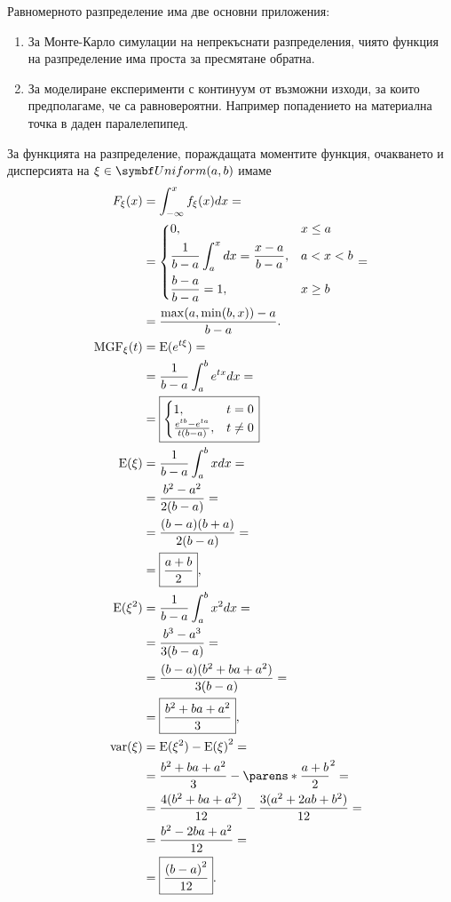 \documentclass{../../common/topic}
\begin{document}
Равномерното разпределение има две основни приложения:
\begin{enumerate}
  \item За Монте-Карло симулации на непрекъснати разпределения, чиято функция на разпределение има проста за пресмятане обратна.
  \item За моделиране експерименти с континуум от възможни изходи, за които предполагаме, че са равновероятни. Например попадението на материална точка в даден паралелепипед.
\end{enumerate}

За функцията на разпределение, пораждащата моментите функция, очакването и дисперсията на \( \xi \in \distr{Uniform}(a, b) \) имаме
\begingroup
\allowdisplaybreaks
\begin{align*}
  F_\xi(x)
  &=
  \int_{-\infty}^x f_\xi(x) dx
  = \\ &=
  \begin{dcases}
    0, &x \leq a \\
    \frac 1 {b-a} \int_a^x dx = \frac {x-a} {b-a}, &a < x < b \\
    \frac {b-a} {b-a} = 1, &x \geq b
  \end{dcases}
  = \\ &=
  \frac {\max(a, \min(b, x))-a} {b-a}.
  \\
  \MGF_\xi(t)
  &=
  \Expect(e^{t\xi})
  = \\ &=
  \frac 1 {b-a} \int_a^b e^{tx} dx
  = \\ &=
  \boxed{\begin{cases}
    1, &t = 0 \\
    \frac {e^{tb} - e^{ta}} {t(b-a)}, &t \neq 0
  \end{cases}}
  \\
  \Expect(\xi)
  &=
  \frac 1 {b-a} \int_a^b x dx
  = \\ &=
  \frac {b^2 - a^2} {2(b-a)}
  = \\ &=
  \frac {(b-a)(b+a)} {2(b-a)}
  = \\ &=
  \boxed{\frac {a + b} 2},
  \\
  \Expect(\xi^2)
  &=
  \frac 1 {b-a} \int_a^b x^2 dx
  = \\ &=
  \frac {b^3 - a^3} {3(b-a)}
  = \\ &=
  \frac {(b-a)(b^2+ba+a^2)} {3(b-a)}
  = \\ &=
  \boxed{\frac {b^2+ba+a^2} 3},
  \\
  \var(\xi)
  &=
  \Expect(\xi^2) - {\Expect(\xi)}^2
  = \\ &=
  \frac {b^2+ba+a^2} 3 - {\parens*{\frac {a+b} 2 }}^2
  = \\ &=
  \frac {4(b^2+ba+a^2)} {12} - \frac {3 (a^2+2ab+b^2)} {12}
  = \\ &=
  \frac {b^2-2ba+a^2} {12}
  = \\ &=
  \boxed{\frac {{(b-a)}^2} {12}}.
\end{align*}
\endgroup
\end{document}
